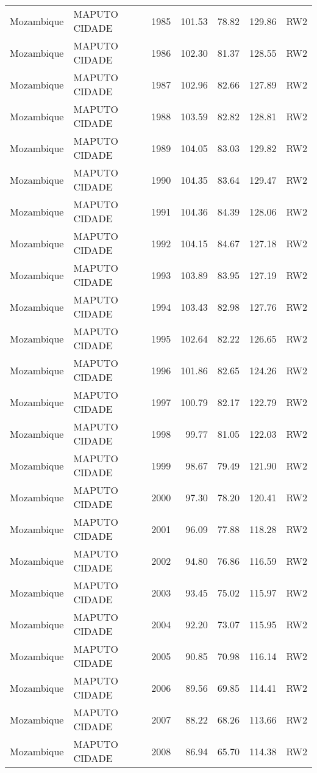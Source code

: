 \begin{longtable}{lllrrrl}
  Mozambique & MAPUTO CIDADE & 1985 & 101.53 & 78.82 & 129.86 & RW2 \\ 
  Mozambique & MAPUTO CIDADE & 1986 & 102.30 & 81.37 & 128.55 & RW2 \\ 
  Mozambique & MAPUTO CIDADE & 1987 & 102.96 & 82.66 & 127.89 & RW2 \\ 
  Mozambique & MAPUTO CIDADE & 1988 & 103.59 & 82.82 & 128.81 & RW2 \\ 
  Mozambique & MAPUTO CIDADE & 1989 & 104.05 & 83.03 & 129.82 & RW2 \\ 
  Mozambique & MAPUTO CIDADE & 1990 & 104.35 & 83.64 & 129.47 & RW2 \\ 
  Mozambique & MAPUTO CIDADE & 1991 & 104.36 & 84.39 & 128.06 & RW2 \\ 
  Mozambique & MAPUTO CIDADE & 1992 & 104.15 & 84.67 & 127.18 & RW2 \\ 
  Mozambique & MAPUTO CIDADE & 1993 & 103.89 & 83.95 & 127.19 & RW2 \\ 
  Mozambique & MAPUTO CIDADE & 1994 & 103.43 & 82.98 & 127.76 & RW2 \\ 
  Mozambique & MAPUTO CIDADE & 1995 & 102.64 & 82.22 & 126.65 & RW2 \\ 
  Mozambique & MAPUTO CIDADE & 1996 & 101.86 & 82.65 & 124.26 & RW2 \\ 
  Mozambique & MAPUTO CIDADE & 1997 & 100.79 & 82.17 & 122.79 & RW2 \\ 
  Mozambique & MAPUTO CIDADE & 1998 & 99.77 & 81.05 & 122.03 & RW2 \\ 
  Mozambique & MAPUTO CIDADE & 1999 & 98.67 & 79.49 & 121.90 & RW2 \\ 
  Mozambique & MAPUTO CIDADE & 2000 & 97.30 & 78.20 & 120.41 & RW2 \\ 
  Mozambique & MAPUTO CIDADE & 2001 & 96.09 & 77.88 & 118.28 & RW2 \\ 
  Mozambique & MAPUTO CIDADE & 2002 & 94.80 & 76.86 & 116.59 & RW2 \\ 
  Mozambique & MAPUTO CIDADE & 2003 & 93.45 & 75.02 & 115.97 & RW2 \\ 
  Mozambique & MAPUTO CIDADE & 2004 & 92.20 & 73.07 & 115.95 & RW2 \\ 
  Mozambique & MAPUTO CIDADE & 2005 & 90.85 & 70.98 & 116.14 & RW2 \\ 
  Mozambique & MAPUTO CIDADE & 2006 & 89.56 & 69.85 & 114.41 & RW2 \\ 
  Mozambique & MAPUTO CIDADE & 2007 & 88.22 & 68.26 & 113.66 & RW2 \\ 
  Mozambique & MAPUTO CIDADE & 2008 & 86.94 & 65.70 & 114.38 & RW2 \\ 

\end{longtable}

